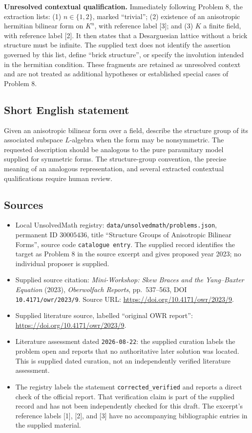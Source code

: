 \documentclass[11pt]{article}
\begin{document}
\textbf{Unresolved contextual qualification.} Immediately following Problem 8, the extraction lists: (1) \(n\in\{1,2\}\), marked ``trivial''; (2) existence of an anisotropic hermitian bilinear form on \(K^n\), with reference label [3]; and (3) \(K\) a finite field, with reference label [2]. It then states that a Desarguesian lattice without a brick structure must be infinite. The supplied text does not identify the assertion governed by this list, define ``brick structure'', or specify the involution intended in the hermitian condition. These fragments are retained as unresolved context and are not treated as additional hypotheses or established special cases of Problem 8.
\subsection{Short English statement}
Given an anisotropic bilinear form over a field, describe the structure group of its associated subspace \(L\)-algebra when the form may be nonsymmetric. The requested description should be analogous to the pure paraunitary model supplied for symmetric forms. The structure-group convention, the precise meaning of an analogous representation, and several extracted contextual qualifications require human review.
\subsection{Sources}
\begin{itemize}
\item Local UnsolvedMath registry: \texttt{data/unsolvedmath/problems.json}, permanent ID \(30005436\), title ``Structure Groups of Anisotropic Bilinear Forms'', source code \texttt{catalogue entry}. The supplied record identifies the target as Problem 8 in the source excerpt and gives proposed year 2023; no individual proposer is supplied.
\item Supplied source citation: \emph{Mini-Workshop: Skew Braces and the Yang--Baxter Equation} (2023), \emph{Oberwolfach Reports}, pp.\ 537--563, DOI \texttt{10.4171/owr/2023/9}. Source URL: \url{https://doi.org/10.4171/owr/2023/9}.
\item Supplied literature source, labelled ``original OWR report'': \url{https://doi.org/10.4171/owr/2023/9}.
\item Literature assessment dated \texttt{2026-08-22}: the supplied curation labels the problem open and reports that no authoritative later solution was located. This is supplied dated curation, not an independently verified literature assessment.
\item The registry labels the statement \texttt{corrected\_verified} and reports a direct check of the official report. That verification claim is part of the supplied record and has not been independently checked for this draft. The excerpt's reference labels [1], [2], and [3] have no accompanying bibliographic entries in the supplied material.
\end{itemize}
\end{document}
